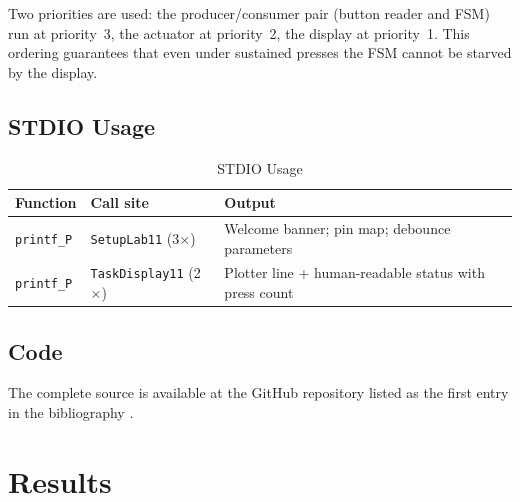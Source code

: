 \documentclass[12pt]{article}
\begin{document}
Two priorities are used: the producer/consumer pair (button reader and FSM) run at priority~3, the actuator at priority~2, the display at priority~1. This ordering guarantees that even under sustained presses the FSM cannot be starved by the display.

\subsection{STDIO Usage}

\begin{table}[H]
\centering
\begin{tabular}{@{}lp{4cm}p{6.0cm}@{}}
\toprule
\textbf{Function} & \textbf{Call site} & \textbf{Output} \\
\midrule
\texttt{printf\_P} & \texttt{SetupLab11} (3$\times$) & Welcome banner; pin map; debounce parameters \\
\texttt{printf\_P} & \texttt{TaskDisplay11} (2$\times$) & Plotter line + human-readable status with press count \\
\bottomrule
\end{tabular}
\caption{STDIO Usage}
\label{tab:stdio}
\end{table}

\subsection{Code}

The complete source is available at the GitHub repository listed as the first entry in the bibliography \cite{code}.

\section{Results}\label{sec:results}
\end{document}
